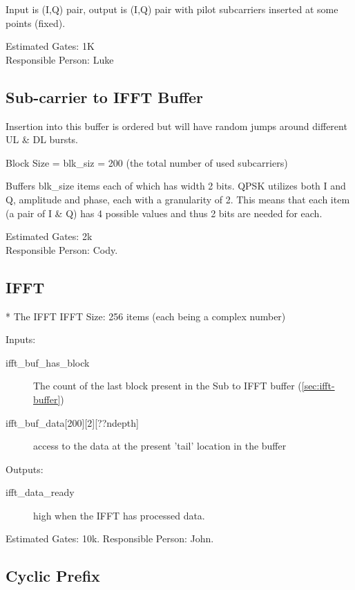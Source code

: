 \documentclass[dvips,10pt,twocolumn]{article}
\begin{document}
	Input is (I,Q) pair, output is (I,Q) pair with pilot subcarriers
	inserted at some points (fixed).

	Estimated Gates: 1K \\
	Responsible Person: Luke

	\subsection{Sub-carrier to IFFT Buffer}
	\label{sec:ifft-buffer}
	Insertion into this buffer is ordered but will have random
	jumps around different UL \& DL bursts.

	Block Size = blk\_siz = 200 (the total number of used
	subcarriers)
	
	Buffers blk\_size items each of which has width 2 bits.
	QPSK utilizes both I and Q, amplitude and phase, each with
	a granularity of 2. This means that each item (a pair of I
	\& Q) has 4 possible values and thus 2 bits are needed for
	each.

	Estimated Gates: 2k \\
	Responsible Person: Cody.

	\subsection{IFFT}
	\label{sec:ifft}
	*
	The IFFT 
	IFFT Size: 256 items (each being a complex number)
	\begin{description}
		\item{Inputs:}
		\begin{description}
			\item[ifft\_buf\_has\_block] The count of the last
				block present in the Sub to IFFT buffer
				(\autoref{sec:ifft-buffer})
			
			\item[ifft\_buf\_data{[200][2][??ndepth]}] access
				to the data at the present 'tail' location
				in the buffer
		\end{description}
		
		\item{Outputs:}
		\begin{description}
			\item[ifft\_data\_ready] high when the IFFT has
				processed data.
		\end{description}
	\end{description}

	Estimated Gates: 10k.
	Responsible Person: John.

	\subsection{Cyclic Prefix}
	\label{sec:cyclic_prefix}
	
\end{document}
